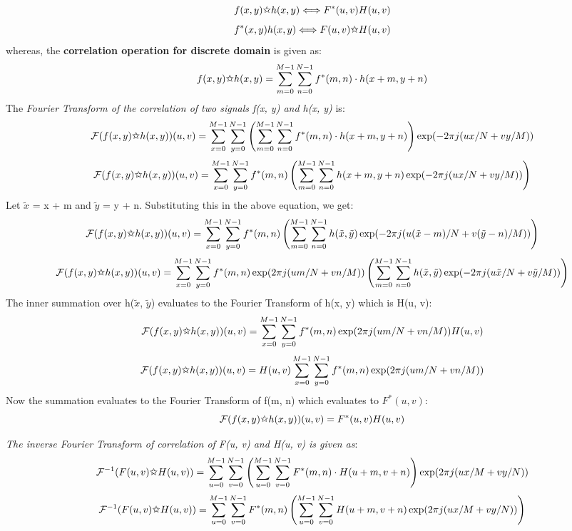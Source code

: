 \documentclass{article}
\begin{document}
\begin{enumerate}
\[
f(x, y) \text{\ding{73}} h(x, y) \Longleftrightarrow F^*(u, v) H(u, v)
\]
\[
f^*(x, y) h(x, y) \Longleftrightarrow F(u, v) \text{\ding{73}} H(u, v)
\]
whereas, the \textbf{correlation operation for discrete domain} is given as:
\[
f(x, y) \text{\ding{73}} h(x, y) = \sum_{m=0}^{M-1} \sum_{n=0}^{N-1} f^*(m, n) \cdot h(x + m, y + n)
\]
The \textit{Fourier Transform of the correlation of two signals f(x, y) and h(x, y)} is:
\[
\mathcal{F}(f(x, y) \text{\ding{73}} h(x, y))(u, v) = \sum_{x=0}^{M-1} \sum_{y=0}^{N-1} \left( \sum_{m=0}^{M-1} \sum_{n=0}^{N-1} f^*(m, n) \cdot h(x + m, y + n) \right) \exp(-2 \pi j (ux/N + vy/M)) 
\]
\[
\mathcal{F}(f(x, y) \text{\ding{73}} h(x, y))(u, v) = \sum_{x=0}^{M-1} \sum_{y=0}^{N-1} f^*(m, n) \left( \sum_{m=0}^{M-1} \sum_{n=0}^{N-1} h(x + m, y + n) \exp(-2 \pi j (ux/N + vy/M)) \right)
\]
Let $\tilde{x}$ = x + m and $\tilde{y}$ = y + n. Substituting this in the above equation, we get:
\[
\mathcal{F}(f(x, y) \text{\ding{73}} h(x, y))(u, v) = \sum_{x=0}^{M-1} \sum_{y=0}^{N-1} f^*(m, n) \left( \sum_{m=0}^{M-1} \sum_{n=0}^{N-1} h(\tilde{x}, \tilde{y}) \exp(-2 \pi j (u(\tilde{x} - m)/N + v(\tilde{y} - n)/M)) \right)
\]
\[
\mathcal{F}(f(x, y) \text{\ding{73}} h(x, y))(u, v) = \sum_{x=0}^{M-1} \sum_{y=0}^{N-1} f^*(m, n) \exp(2 \pi j (um/N + vn/M)) \left( \sum_{m=0}^{M-1} \sum_{n=0}^{N-1} h(\tilde{x}, \tilde{y}) \exp(-2 \pi j (u\tilde{x}/N + v\tilde{y}/M)) \right)
\]
\newpage
The inner summation over h($\tilde{x}$, $\tilde{y}$) evaluates to the Fourier Transform of h(x, y) which is H(u, v):
\[
\mathcal{F}(f(x, y) \text{\ding{73}} h(x, y))(u, v) = \sum_{x=0}^{M-1} \sum_{y=0}^{N-1} f^*(m, n) \exp(2 \pi j (um/N + vn/M)) H(u, v)
\]
\[
\mathcal{F}(f(x, y) \text{\ding{73}} h(x, y))(u, v) = H(u, v) \sum_{x=0}^{M-1} \sum_{y=0}^{N-1} f^*(m, n) \exp(2 \pi j (um/N + vn/M))
\]
Now the summation evaluates to the Fourier Transform of f(m, n) which evaluates to $F^*(u, v)$:
\[
\mathcal{F}(f(x, y) \text{\ding{73}} h(x, y))(u, v) = F^*(u, v) H(u, v)
\]

\textit{The inverse Fourier Transform of correlation of F(u, v) and H(u, v) is given as}:
\[
    \mathcal{F}^{-1}(F(u, v) \text{\ding{73}} H(u, v)) = \sum_{u=0}^{M-1} \sum_{v=0}^{N-1} \left( \sum_{u=0}^{M-1} \sum_{v=0}^{N-1} F^*(m, n) \cdot H(u + m, v + n) \right) \exp(2 \pi j (ux/M + vy/N))
\]
\[
    \mathcal{F}^{-1}(F(u, v) \text{\ding{73}} H(u, v)) = \sum_{u=0}^{M-1} \sum_{v=0}^{N-1} F^*(m, n) \left( \sum_{u=0}^{M-1} \sum_{v=0}^{N-1} H(u + m, v + n) \exp(2 \pi j (ux / M+ vy/N)) \right)
\]


\end{enumerate}
\end{document}

